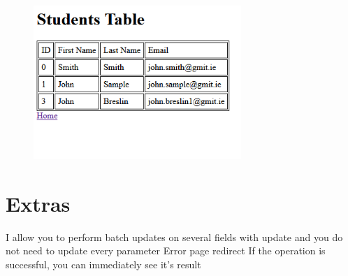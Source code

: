 \documentclass{article}
\begin{document}
		\begin{figure}[h!]
			\centering
			\includegraphics[width=0.7\textwidth]{11.png}
		\end{figure}
	\section{Extras}
	I allow you to perform batch updates on several fields with update and you do not need to update every parameter
	Error page redirect
	If the operation is successful, you can immediately see it's result
	
	
\end{document}
